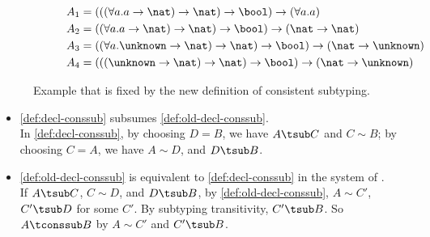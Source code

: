 \begin{figure}[t]
  \centering
  \begin{subfigure}[b]{.4\linewidth}
  \end{subfigure}
  \begin{subfigure}[b]{.4\linewidth}
  \begin{align*}
  A_1 &=(((\forall a. a \to \nat) \to \nat) \to \bool) \to (\forall a. a) \\
  A_2 &= ((\forall a. a \to \nat) \to \nat) \to \bool) \to (\nat \to \nat) \\
  A_3 &= ((\forall a. \unknown \to \nat) \to \nat) \to \bool) \to (\nat \to \unknown) \\
  A_4 &= (((\unknown \to \nat) \to \nat) \to \bool) \to (\nat \to \unknown)
  \end{align*}
  \end{subfigure}
  \caption{Example that is fixed by the new definition of consistent subtyping.}
  \label{fig:example:c:fix}
\end{figure}

\begin{proposition}\leavevmode
  \label{prop:subsumes}
\begin{itemize}
  \item \cref{def:decl-conssub} subsumes
    \cref{def:old-decl-conssub}.
    \\In \cref{def:decl-conssub},
    by choosing $D=B$, we have $A\tsub C$ and $C \sim B$; by choosing $C=A$, we have
    $A \sim D$, and $D \tsub B$.
  \item \cref{def:old-decl-conssub} is equivalent to
    \cref{def:decl-conssub} in the system of \citeauthor{siek2007gradual}.
    \\If $A \tsub C$, $C \sim D$, and $D \tsub
    B$, by \cref{def:old-decl-conssub},
    $A \sim C'$, $C' \tsub D$ for some $C'$. By subtyping
    transitivity, $C' \tsub B$. So $A \tconssub B$ by $A \sim C'$ and $C'
    \tsub B$.
  \end{itemize}
\end{proposition}


